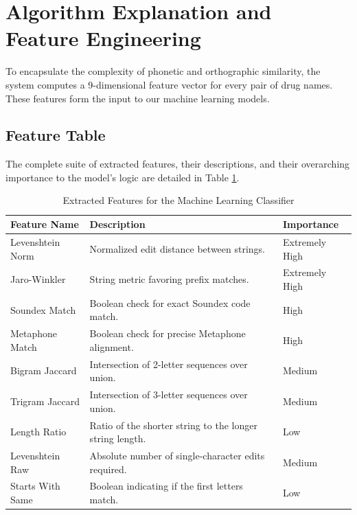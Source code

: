 \documentclass[12pt,a4paper]{report}
\begin{document}
\section{Algorithm Explanation and Feature Engineering}
To encapsulate the complexity of phonetic and orthographic similarity, the system computes a 9-dimensional feature vector for every pair of drug names. These features form the input to our machine learning models.

\subsection{Feature Table}
The complete suite of extracted features, their descriptions, and their overarching importance to the model's logic are detailed in Table \ref{tab:feature_desc}.

\begin{table}[H]
\centering
\caption{Extracted Features for the Machine Learning Classifier}
\label{tab:feature_desc}
\renewcommand{\arraystretch}{1.3}
\begin{tabular}{@{}p{3.5cm}p{7cm}p{4cm}@{}}
\toprule
\textbf{Feature Name} & \textbf{Description} & \textbf{Importance} \\
\midrule
Levenshtein Norm & Normalized edit distance between strings. & Extremely High \\
Jaro-Winkler & String metric favoring prefix matches. & Extremely High \\
Soundex Match & Boolean check for exact Soundex code match. & High \\
Metaphone Match & Boolean check for precise Metaphone alignment. & High \\
Bigram Jaccard & Intersection of 2-letter sequences over union. & Medium \\
Trigram Jaccard & Intersection of 3-letter sequences over union. & Medium \\
Length Ratio & Ratio of the shorter string to the longer string length. & Low \\
Levenshtein Raw & Absolute number of single-character edits required. & Medium \\
Starts With Same & Boolean indicating if the first letters match. & Low \\
\bottomrule
\end{tabular}
\end{table}
\end{document}
